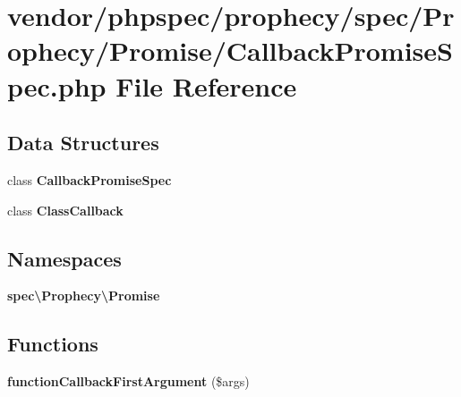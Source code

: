 \section{vendor/phpspec/prophecy/spec/\+Prophecy/\+Promise/\+Callback\+Promise\+Spec.php File Reference}
\label{_callback_promise_spec_8php}
\subsection*{Data Structures}
\begin{DoxyCompactItemize}
\item 
class {\bf Callback\+Promise\+Spec}
\item 
class {\bf Class\+Callback}
\end{DoxyCompactItemize}
\subsection*{Namespaces}
\begin{DoxyCompactItemize}
\item 
 {\bf spec\textbackslash{}\+Prophecy\textbackslash{}\+Promise}
\end{DoxyCompactItemize}
\subsection*{Functions}
\begin{DoxyCompactItemize}
\item 
{\bf function\+Callback\+First\+Argument} (\$args)
\end{DoxyCompactItemize}
